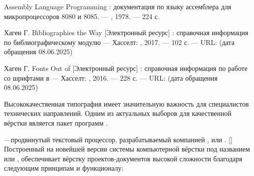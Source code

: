 \startitem[item: i8080]
 Assembly Language Programming : документация по языку ассемблера для микропроцессоров  8080 и 8085. --- , 1978. --- 224 с.
\stopitem

\stopitem

\stopitem

Хаген Г. Bibliographies the  Way [Электронный ресурс] : справочная информация по библиографическому модулю  --- Хасселт: , 2017. --- 102 с. --- URL: \from[bibliographies] (дата обращения 08.06.2025)
\stopitem

Хаген Г. Fonts Out of  [Электронный ресурс] : справочная информация по работе со шрифтами в  --- Хасселт: , 2016. --- 228 с. --- URL:  (дата обращения 08.06.2025)
\stopitem

%

\stopitemize

\stoptitle

\stopsectionblock

\startappendices

\startappendixchapter[
    title={Характеристика текстового процессора \corp{Con\abbr{\TeX}t}},
    bookmark={Характеристика текстового процессора ConTeXt},
    reference={appendixchapter: context desc},
]

Высококачественная типография имеет значительную важность для специалистов
технических направлений. Одним из актуальных выборов  для качественной
вёрстки является пакет программ .

---продвинутый текстовый процессор, разрабатываемый компанией
, или .
[] Построенный на новейшей версии системы компьютерной
вёрстки \corp{\abbr{\TeX}} под названием  или ,
 обеспечивает вёрстку проектов-документов высокой сложности
благодаря следующим принципам и функционалу:


